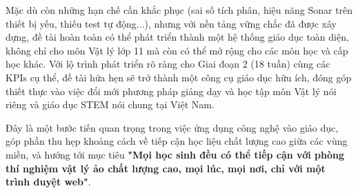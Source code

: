Mặc dù còn những hạn chế cần khắc phục (sai số tích phân, hiệu năng Sonar trên thiết bị yếu, thiếu test tự động...), nhưng với nền tảng vững chắc đã được xây dựng, đề tài hoàn toàn có thể phát triển thành một hệ thống giáo dục toàn diện, không chỉ cho môn Vật lý lớp 11 mà còn có thể mở rộng cho các môn học và cấp học khác. Với lộ trình phát triển rõ ràng cho Giai đoạn 2 (18 tuần) cùng các KPIs cụ thể, đề tài hứa hẹn sẽ trở thành một công cụ giáo dục hữu ích, đóng góp thiết thực vào việc đổi mới phương pháp giảng dạy và học tập môn Vật lý nói riêng và giáo dục STEM nói chung tại Việt Nam.

Đây là một bước tiến quan trọng trong việc ứng dụng công nghệ vào giáo dục, góp phần thu hẹp khoảng cách về tiếp cận học liệu chất lượng cao giữa các vùng miền, và hướng tới mục tiêu \textbf{"Mọi học sinh đều có thể tiếp cận với phòng thí nghiệm vật lý ảo chất lượng cao, mọi lúc, mọi nơi, chỉ với một trình duyệt web"}.